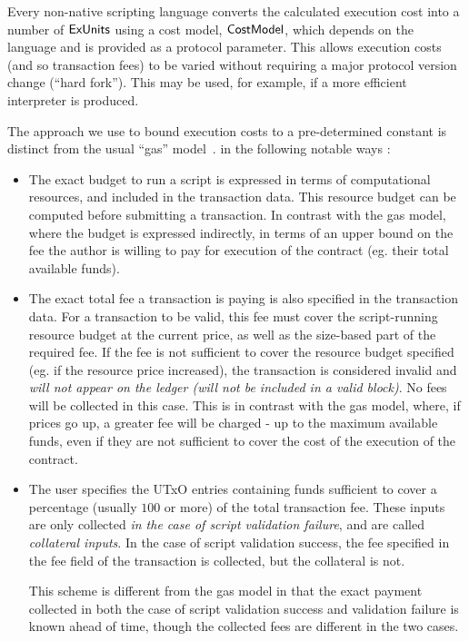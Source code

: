 Every non-native scripting language
converts the calculated execution cost into a number of $\mathsf{ExUnits}$ using a cost model,
$\mathsf{CostModel}$, which depends on the language and is provided as a protocol parameter.
This allows execution costs (and so transaction fees) to be varied without requiring a major protocol version change (``hard fork'').
This may be used, for example, if a more efficient interpreter is produced.

The approach we use to bound execution costs to a pre-determined constant is
distinct from the usual ``gas'' model~\cite{XX}. in the following notable ways :

\begin{itemize}
  \item The exact budget to run a script is expressed in terms of computational resources,
  and included in the transaction data. This resource budget can be computed before submitting a transaction.
  In contrast with the gas model, where the budget is expressed indirectly,
  in terms of an upper bound on the fee the author is willing to pay for execution of the
  contract (eg. their total available funds).

  \item The exact total fee a transaction is paying is also specified in the transaction data.
  For a transaction to be valid, this fee must cover the script-running resource budget at the current price,
  as well as the size-based part of the required fee.
  If the fee is not sufficient to cover the resource budget specified (eg. if the resource price increased),
  the transaction is considered invalid and \emph{will not appear on the ledger (will not be included in a valid block)}.
  No fees will be collected in this case.
  This is in contrast with the gas model, where, if prices go up, a greater fee will be charged - up to
  the maximum available funds, even if they are not sufficient to cover the cost of the execution of the contract.

  \item The user specifies the UTxO entries containing funds sufficient to cover a percentage
  (usually $100$ or more) of the total transaction fee.
  These inputs are only collected \emph{in the case of script validation failure},
  and are called \emph{collateral inputs}. In the case of
  script validation success, the fee specified in the fee field of the transaction is collected,
  but the collateral is not.

  This scheme is different from the gas model in that the exact payment collected in
  both the case of script validation success and validation failure is known ahead of time,
  though the collected fees are different in the two cases.
\end{itemize}

